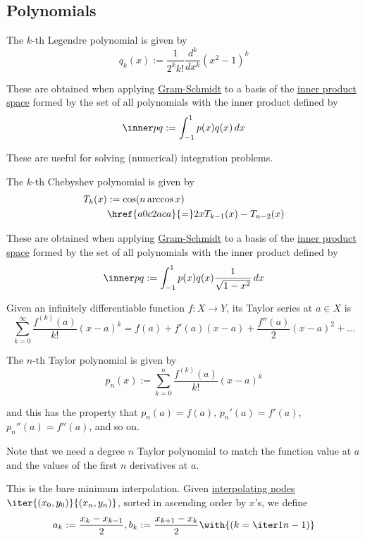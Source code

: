 \subsection{Polynomials}\label{d68e870}

\label{e9ef1ac}

The $k$-th Legendre polynomial is given by
$$
  q_k(x):=\frac1{2^kk!}\frac{d^k}{dx^k}(x^2-1)^k
$$

These are obtained when applying \href{ee6ac50}{Gram-Schmidt} to a basis of the
\href{b9935c8}{inner product space} formed by the set of all polynomials with
the inner product defined by
$$
  \inner pq:=\int_{-1}^1p(x)q(x)\,dx
$$

These are useful for solving (numerical) integration problems.

\label{e7283ca}

The $k$-th Chebyshev polynomial is given by
\begin{align*}
  T_k(x) &:=\cos(n\arccos x)                       \\
         &\href{a0c2aca}{=}2xT_{k-1}(x)-T_{n-2}(x)
\end{align*}

These are obtained when applying \href{ee6ac50}{Gram-Schmidt} to a basis of the
\href{b9935c8}{inner product space} formed by the set of all polynomials with
the inner product defined by
$$
  \inner pq:=\int_{-1}^1p(x)q(x)\frac1{\sqrt{1-x^2}}\,dx
$$

\label{ab7e885}

Given an infinitely differentiable function $f:X\to Y$, its Taylor series at
$a\in X$ is
$$
  \sum_{k=0}^\infty\frac{f^{(k)}(a)}{k!}(x-a)^k=f(a)+f'(a)(x-a)+\frac{f''(a)}2(x-a)^2+\ldots
$$

The $n$-th Taylor polynomial is given by
$$
  p_n(x):=\sum_{k=0}^n\frac{f^{(k)}(a)}{k!}(x-a)^k
$$

and this has the property that $p_n(a)=f(a)$, $p_n'(a)=f'(a)$,
$p_n''(a)=f''(a)$, and so on.

Note that we need a degree $n$ Taylor polynomial to match the function value at
$a$ and the values of the first $n$ derivatives at $a$.

\label{c6b82a5}

This is the bare minimum interpolation. Given \href{a33bce0}{interpolating
nodes} $\iter{(x_0,y_0)}{(x_n,y_n)}$, sorted in ascending order by $x$'s, we
define
\begin{equation*}
  a_k:=\frac{x_k-x_{k-1}}2,
  b_k:=\frac{x_{k+1}-x_k}2\with{(k=\iter1{n-1})}
\end{equation*}

